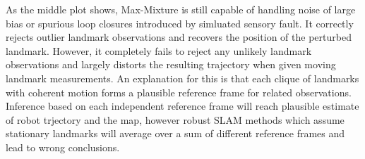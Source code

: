 As the middle plot shows, Max-Mixture is still capable of handling noise of
large bias or spurious loop closures introduced by simluated sensory fault. It
correctly rejects outlier landmark observations and recovers the position of
the perturbed landmark. However, it completely fails to reject any unlikely
landmark observations and largely distorts the resulting trajectory when given
moving landmark measurements. An explanation for this is that each clique of
landmarks with coherent motion forms a plausible reference frame for related
observations. Inference based on each independent reference frame will reach
plausible estimate of robot trjectory and the map, however robust SLAM methods
which assume stationary landmarks will average over a sum of different
reference frames and lead to wrong conclusions.

